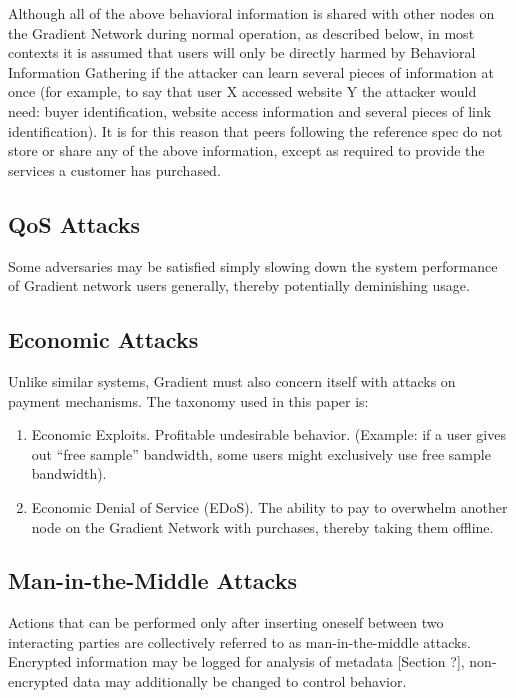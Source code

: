\documentclass{article}
\begin{document}
Although all of the above behavioral information is shared with other nodes on the Gradient Network during normal operation, as described below, in most contexts it is assumed that users will only be directly harmed by Behavioral Information Gathering if the attacker can learn several pieces of information at once (for example, to say that user X accessed website Y the attacker would need: buyer identification, website access information and several pieces of link identification). It is for this reason that peers following the reference spec do not store or share any of the above information, except as required to provide the services a customer has purchased.

\subsection{QoS Attacks}
\label{qos}

Some adversaries may be satisfied simply slowing down the system performance of Gradient network users generally, thereby potentially deminishing usage.

\subsection{Economic Attacks}
\label{econ-attacks}

Unlike similar systems, Gradient must also concern itself with attacks on payment mechanisms. The taxonomy used in this paper is:

\begin{enumerate}
    \item Economic Exploits. Profitable undesirable behavior. (Example: if a user gives out “free sample” bandwidth, some users might exclusively use free sample bandwidth).
    \item Economic Denial of Service (EDoS). The ability to pay to overwhelm another node on the Gradient Network with purchases, thereby taking them offline.
\end{enumerate}

\subsection{Man-in-the-Middle Attacks}
\label{mitm}

Actions that can be performed only after inserting oneself between two interacting parties are collectively referred to as man-in-the-middle attacks. Encrypted information may be logged for analysis of metadata [Section ?], non-encrypted data may additionally be changed to control behavior.
\end{document}
